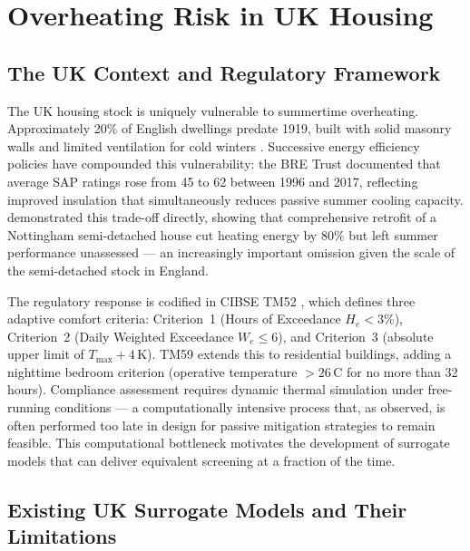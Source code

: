 \documentclass[12pt,a4paper]{report}
\begin{document}
\section{Overheating Risk in UK Housing}
\label{sec:overheating}

\subsection{The UK Context and Regulatory Framework}
\label{sec:uk-context}

The UK housing stock is uniquely vulnerable to summertime overheating. Approximately 20\% of English dwellings predate 1919, built with solid masonry walls and limited ventilation for cold winters \citep{Piddington2020}. Successive energy efficiency policies have compounded this vulnerability: the BRE Trust \citeyearpar{BRETrust2020} documented that average SAP ratings rose from 45 to 62 between 1996 and 2017, reflecting improved insulation that simultaneously reduces passive summer cooling capacity. \citet{Shatat2015} demonstrated this trade-off directly, showing that comprehensive retrofit of a Nottingham semi-detached house cut heating energy by 80\% but left summer performance unassessed --- an increasingly important omission given the scale of the semi-detached stock in England.

The regulatory response is codified in CIBSE TM52 \citep{CIBSE2013}, which defines three adaptive comfort criteria: Criterion~1 (Hours of Exceedance $H_e < 3\%$), Criterion~2 (Daily Weighted Exceedance $W_e \leq 6$), and Criterion~3 (absolute upper limit of $T_{\max} + 4$\,K). TM59 \citep{CIBSE2017} extends this to residential buildings, adding a nighttime bedroom criterion (operative temperature $> 26$\,\textdegree C for no more than 32 hours). Compliance assessment requires dynamic thermal simulation under free-running conditions --- a computationally intensive process that, as \citet{Botti2022} observed, is often performed too late in design for passive mitigation strategies to remain feasible. This computational bottleneck motivates the development of surrogate models that can deliver equivalent screening at a fraction of the time.

\subsection{Existing UK Surrogate Models and Their Limitations}
\label{sec:uk-surrogates}
\end{document}
